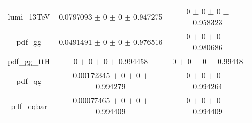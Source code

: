 \begin{table}
\begin{tabular}{ccc}
lumi\_13TeV & \num{0.0797093} $\pm$ \num{0} $\pm$ \num{0} $\pm$ \num{0.947275} & \num{0} $\pm$ \num{0} $\pm$ \num{0} $\pm$ \num{0.958323}\\
pdf\_gg & \num{0.0491491} $\pm$ \num{0} $\pm$ \num{0} $\pm$ \num{0.976516} & \num{0} $\pm$ \num{0} $\pm$ \num{0} $\pm$ \num{0.980686}\\
pdf\_gg\_ttH & \num{0} $\pm$ \num{0} $\pm$ \num{0} $\pm$ \num{0.994458} & \num{0} $\pm$ \num{0} $\pm$ \num{0} $\pm$ \num{0.99448}\\
pdf\_qg & \num{0.00172345} $\pm$ \num{0} $\pm$ \num{0} $\pm$ \num{0.994279} & \num{0} $\pm$ \num{0} $\pm$ \num{0} $\pm$ \num{0.994264}\\
pdf\_qqbar & \num{0.00077465} $\pm$ \num{0} $\pm$ \num{0} $\pm$ \num{0.994409} & \num{0} $\pm$ \num{0} $\pm$ \num{0} $\pm$ \num{0.994409}\\
\bottomrule
\end{tabular}
\end{table}